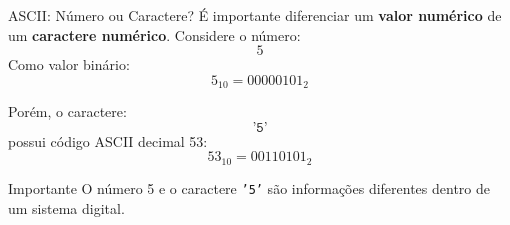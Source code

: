 \begin{frame}{ASCII: Número ou Caractere?}
    \small
    É importante diferenciar um \textbf{valor numérico}
    de um \textbf{caractere numérico}.
    Considere o número:
    \[
        5
    \]
    Como valor binário:
    \[
        5_{10}=00000101_2
    \]

    Porém, o caractere:
    \[
        \texttt{'5'}
    \]
    possui código ASCII decimal 53:
    \[
        53_{10}=00110101_2
    \]
    \begin{alertblock}{Importante}
        O número 5 e o caractere \texttt{'5'} são informações
        diferentes dentro de um sistema digital.
    \end{alertblock}
\end{frame}